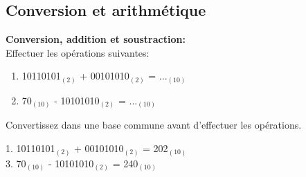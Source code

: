 \begin{comment}
\subsection{Arithmétique binaire}

\begin{Exercice}[5 minutes] \textbf{Addition et soustraction de nombres binaires}
    \begin{enumerate}
        \item Additionner \lstinline{10110101}$_{(2)}$ et \lstinline{00010101}$_{(2)}$
        \item Soustraire \lstinline{11000101}$_{(2)}$ et \lstinline{01000000}$_{(2)}$

    \end{enumerate}
    
     \begin{conseil}
        Cf: exercice 4,5 week 1
    \end{conseil}
    
  

    \begin{solution}
        1. {10110101}$_{(2)}$ + {00010101}$_{(2)}$ = {11001010}$_{(2)}$\\
        2. {11000101}$_{(2)}$ - {01000000}$_{(2)}$ = {10000101}$_{(2)}$
    \end{solution}
\end{Exercice}








\end{comment}
\subsection{Conversion et arithmétique}
\begin{Exercice}[5 minutes] \textbf{Conversion, addition et soustraction:}\\
    Effectuer les opérations suivantes:
    \begin{enumerate}
        \item 10110101$_{(2)}$ + 00101010$_{(2)}$ = ...$_{(10)}$
        \item 70$_{(10)}$ - 10101010$_{(2)}$ = ...$_{(10)}$
    \end{enumerate}
        \begin{conseil}
        Convertissez dans une base commune avant d'effectuer les opérations.
    \end{conseil}
        
    \begin{solution}
        1. 10110101$_{(2)}$ + 00101010$_{(2)}$ = 202$_{(10)}$\\
        3. 70$_{(10)}$ - 10101010$_{(2)}$ = 240$_{(10)}$
    \end{solution}
\end{Exercice}



